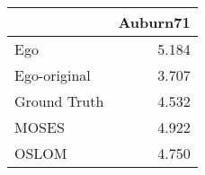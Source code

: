 \begin{tabular}{lr}
\toprule
{} & Auburn71 \\
\midrule
Ego          &    5.184 \\
Ego-original &    3.707 \\
Ground Truth &    4.532 \\
MOSES        &    4.922 \\
OSLOM        &    4.750 \\
\bottomrule
\end{tabular}
